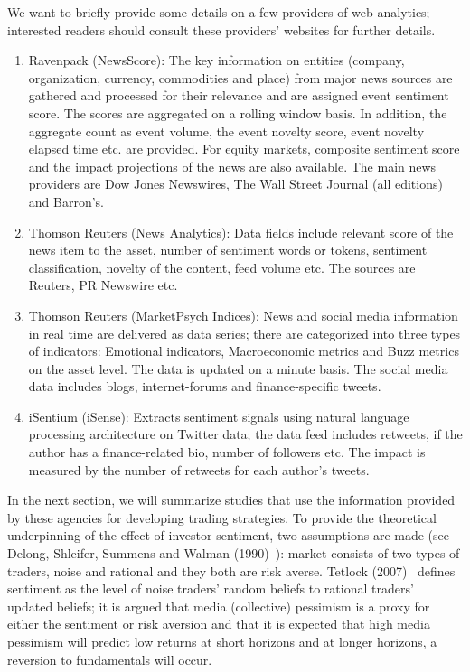 We want to briefly provide some details on a few providers of web analytics; interested readers should consult these providers' websites for further details.
\begin{enumerate}[--]
\item Ravenpack (NewsScore): The key information on entities (company, organization, currency, commodities and place) from major news sources are gathered and processed for their relevance and are assigned event sentiment score. The scores are aggregated on a rolling window basis. In addition, the aggregate count as event volume, the event novelty score, event novelty elapsed time etc. are provided. For equity markets, composite sentiment score and the impact projections of the news are also available. The main news providers are Dow Jones Newswires, The Wall Street Journal (all editions) and Barron's. 

\item Thomson Reuters (News Analytics): Data fields include relevant score of the news item to the asset, number of sentiment words or tokens, sentiment classification, novelty of the content, feed volume etc. The sources are Reuters, PR Newswire etc. 

\item Thomson Reuters (MarketPsych Indices): News and social media information in real time are delivered as data series; there are categorized into three types of indicators: Emotional indicators, Macroeconomic metrics and Buzz metrics on the asset level. The data is updated on a minute basis. The social media data includes blogs, internet-forums and finance-specific tweets.

\item iSentium (iSense): Extracts sentiment signals using natural language processing architecture on Twitter data; the data feed includes retweets, if the author has a finance-related bio, number of followers etc. The impact is measured by the number of retweets for each author's tweets. 
\end{enumerate}


In the next section, we will summarize studies that use the information provided by these agencies for developing trading strategies. To provide the theoretical underpinning of the effect of investor sentiment, two assumptions are made (see Delong, Shleifer, Summens and Walman (1990)~\cite{ssw}): market consists of two types of traders, noise and rational and they both are risk averse. Tetlock (2007)~\cite{tetlock2007giving} defines sentiment as the level of noise traders' random beliefs to rational traders' updated beliefs; it is argued that media (collective) pessimism is a proxy for either the sentiment or risk aversion and that it is expected that high media pessimism will predict low returns at short horizons and at longer horizons, a reversion to fundamentals will occur. 


